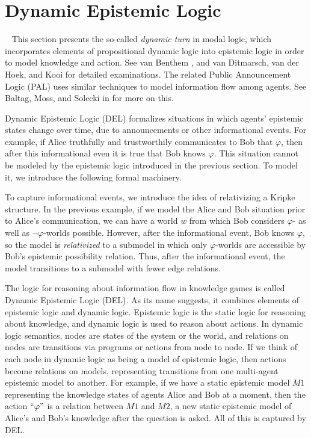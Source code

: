 \section{Dynamic Epistemic Logic}~\label{sec:delsection}
This section presents the so-called \emph{dynamic turn} in modal logic, which incorporates elements of propositional dynamic logic into epistemic logic in order to model knowledge and action. See van Benthem \cite{VB_LDII,VB_MLOM,VB_TowardPlay}, and van Ditmarsch, van der Hoek, and Kooi \cite{DEL} for detailed examinations. The related Public Announcement Logic (PAL) uses similar techniques to model information flow among agents. See Baltag, Moss, and Solecki in \cite{BMS} for more on this.

Dynamic Epistemic Logic (DEL) formalizes situations in which agents' epistemic states change over time, due to announcements or other informational events\cite{DEL}. For example, if Alice truthfully and trustworthily communicates to Bob that $\varphi$, then after this informational even it is true that Bob knows $\varphi$. This situation cannot be modeled by the epistemic logic introduced in the previous section. To model it, we introduce the following formal machinery.

To capture informational events, we introduce the idea of relativizing a Kripke structure. In the previous example, if we model the Alice and Bob situation prior to Alice's communication, we can have a world $w$ from which Bob considers $\varphi$- as well as $\neg\varphi$-worlds possible. However, after the informational event, Bob knows $\varphi$, so the model is \emph{relativized} to a submodel in which only $\varphi$-worlds are accessible by Bob's epistemic possibility relation. Thus, after the informational event, the model transitions to a submodel with fewer edge relations.

The logic for reasoning about information flow in knowledge games is called Dynamic Epistemic Logic (DEL). As its name suggests, it combines elements of epistemic logic and dynamic logic. Epistemic logic is the static logic for reasoning about knowledge, and dynamic logic is used to reason about actions. In dynamic logic semantics, nodes are states of the system or the world, and relations on nodes are transitions via programs or actions from node to node. If we think of each node in dynamic logic as being a model of epistemic logic, then actions become relations on models, representing transitions from one multi-agent epistemic model to another. For example, if we have a static epistemic model $M1$ representing the knowledge states of agents Alice and Bob at a moment, then the action $``\varphi"$ is a relation between $M1$ and $M2$, a new static epistemic model of Alice's and Bob's knowledge after the question is asked. All of this is captured by DEL.

